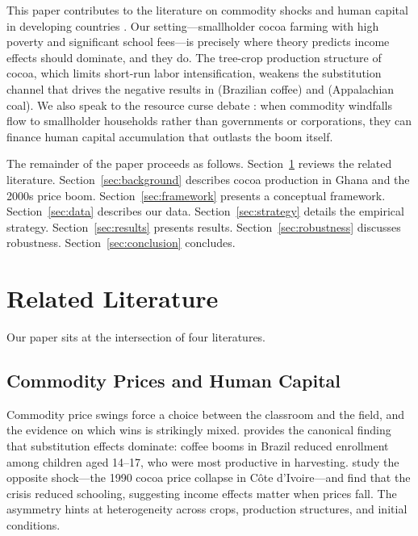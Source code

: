 \documentclass[12pt]{article}
\begin{document}
This paper contributes to the literature on commodity shocks and human capital in developing countries \citep{kruger2007, edmonds2005, cogneau2012, beegle2006, shah2017}. Our setting---smallholder cocoa farming with high poverty and significant school fees---is precisely where theory predicts income effects should dominate, and they do. The tree-crop production structure of cocoa, which limits short-run labor intensification, weakens the substitution channel that drives the negative results in \citet{kruger2007} (Brazilian coffee) and \citet{black2005} (Appalachian coal). We also speak to the resource curse debate \citep{vanderploeg2011, sachs2001}: when commodity windfalls flow to smallholder households rather than governments or corporations, they can finance human capital accumulation that outlasts the boom itself.

The remainder of the paper proceeds as follows. Section~\ref{sec:literature} reviews the related literature. Section~\ref{sec:background} describes cocoa production in Ghana and the 2000s price boom. Section~\ref{sec:framework} presents a conceptual framework. Section~\ref{sec:data} describes our data. Section~\ref{sec:strategy} details the empirical strategy. Section~\ref{sec:results} presents results. Section~\ref{sec:robustness} discusses robustness. Section~\ref{sec:conclusion} concludes.


\section{Related Literature}
\label{sec:literature}

Our paper sits at the intersection of four literatures.

\subsection{Commodity Prices and Human Capital}

Commodity price swings force a choice between the classroom and the field, and the evidence on which wins is strikingly mixed. \citet{kruger2007} provides the canonical finding that substitution effects dominate: coffee booms in Brazil reduced enrollment among children aged 14--17, who were most productive in harvesting. \citet{cogneau2012} study the opposite shock---the 1990 cocoa price collapse in C\^{o}te d'Ivoire---and find that the crisis reduced schooling, suggesting income effects matter when prices fall. The asymmetry hints at heterogeneity across crops, production structures, and initial conditions.
\end{document}
